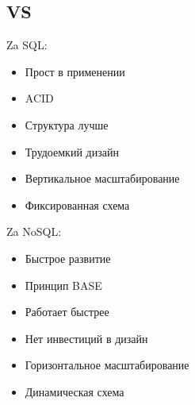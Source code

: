 \subsection*{VS}

Za SQL:
\begin{itemize}
    \item Прост в применении
    \item ACID
    \item Структура лучше
    \item Трудоемкий дизайн
    \item Вертикальное масштабирование
    \item Фиксированная схема
\end{itemize}

Za NoSQL:
\begin{itemize}
    \item Быстрое развитие
    \item Принцип BASE
    \item Работает быстрее
    \item Нет инвестиций в дизайн
    \item Горизонтальное масштабирование
    \item Динамическая схема
\end{itemize}
